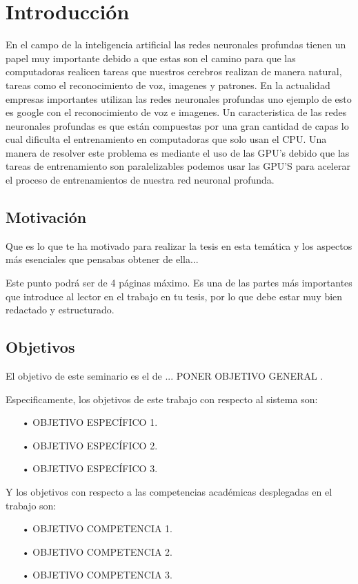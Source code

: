 \chapter{Introducción}
En el campo de la inteligencia artificial las redes neuronales profundas tienen un papel muy importante debido a que estas son el camino para que las computadoras realicen tareas que nuestros cerebros realizan de manera natural, tareas como el reconocimiento de voz, imagenes y patrones. En la actualidad empresas importantes utilizan las redes neuronales profundas uno ejemplo de esto es google con el reconocimiento de voz e imagenes. Un caracteristica de las redes neuronales profundas es que están compuestas por una gran cantidad de capas lo cual dificulta el entrenamiento en computadoras que solo usan el CPU. Una manera de resolver este problema es mediante el uso de las GPU's debido que las tareas de entrenamiento son paralelizables podemos usar las GPU'S para acelerar el proceso de entrenamientos de nuestra red neuronal profunda.

\section{Motivación}
Que es lo que te ha motivado para realizar la tesis en esta temática y los aspectos más esenciales que pensabas obtener de ella...

Este punto podrá ser de 4 páginas máximo. Es una de las partes más importantes que introduce al lector en el trabajo en tu tesis, por lo que debe estar muy bien redactado y estructurado.

\section{Objetivos}

El objetivo de este seminario es el de ... PONER OBJETIVO GENERAL .

Especificamente, los objetivos de este trabajo con respecto al sistema son:

\begin{itemize}
\item[•] OBJETIVO ESPECÍFICO 1.
\item[•] OBJETIVO ESPECÍFICO 2.
\item[•] OBJETIVO ESPECÍFICO 3.


\end{itemize}

Y los objetivos con respecto a las competencias académicas desplegadas en el trabajo son:
\begin{itemize}
\item[•] OBJETIVO COMPETENCIA 1.
\item[•] OBJETIVO COMPETENCIA 2.
\item[•] OBJETIVO COMPETENCIA 3.

\end{itemize}

